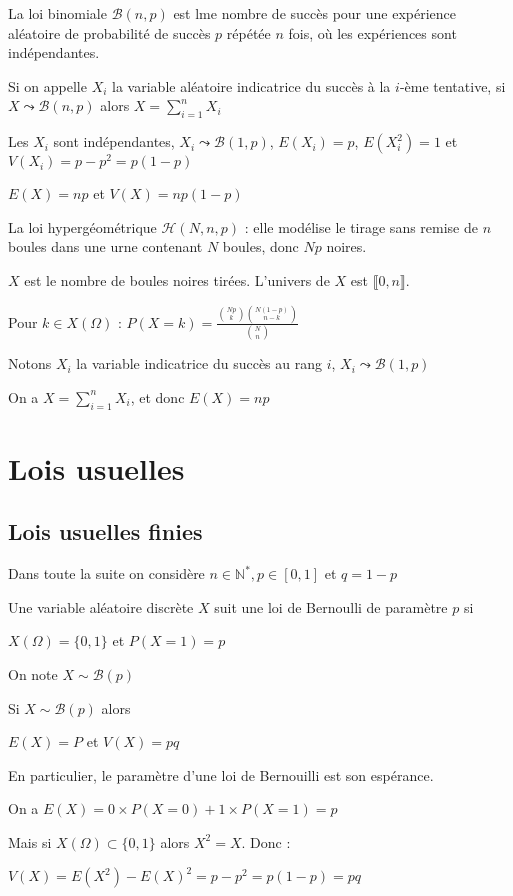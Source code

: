 \documentclass[a4paper,12pt]{book}
\newcommand{\Def}[2]{\begin{tcolorbox}[sharp corners, colback=white,colframe=blue!90!black!75, title=Définition : #1]#2\end{tcolorbox}}
\newcommand{\Prop}[2]{\begin{tcolorbox}[sharp corners, colback=white,colframe=red!90!black!75, title=Proposition : #1]#2\end{tcolorbox}}
\newcommand{\Pre}[1]{\begin{tcolorbox}[sharp corners, colback=white,colframe=green!60!green!30!black!75, title=Preuve]#1\end{tcolorbox}}
\def\N{\mathbb{N}}
\begin{document}
La loi binomiale $\mathcal{B}(n,p)$ est lme nombre de succès pour une expérience aléatoire de probabilité de succès $p$ répétée $n$ fois, où les expériences sont indépendantes.
\par Si on appelle $X_i$ la variable aléatoire indicatrice du succès à la $i$-ème tentative, si $X\leadsto \mathcal{B}(n,p)$ alors $X=\sum\limits_{i=1}^n X_i$
\par Les $X_i$ sont indépendantes, $X_i\leadsto \mathcal{B}(1,p)$, $E(X_i) = p$, $E(X_i^2)=1$ et $V(X_i) = p - p^2 = p(1-p)$
\par $E(X) = np$ et $V(X)=np(1-p)$
\par La loi hypergéométrique $\mathcal{H}(N, n, p)$ : elle modélise le tirage sans remise de $n$ boules dans une urne contenant $N$ boules, donc $Np$ noires.
\par $X$ est le nombre de boules noires tirées. L'univers de $X$ est $\llbracket 0, n\rrbracket$.
\par Pour $k\in X(\Omega)$ : $P(X=k) = \frac{\binom{Np}{k}\binom{N(1-p)}{n-k}}{\binom{N}{n}}$
\par Notons $X_i$ la variable indicatrice du succès au rang $i$, $X_i\leadsto \mathcal{B}(1,p)$
\par On a $X=\sum\limits_{i=1}^n X_i$, et donc $E(X) = np$

\section{Lois usuelles}
\subsection{Lois usuelles finies}
Dans toute la suite on considère $n\in\N^*, p\in[0,1]$ et $q=1-p$
\Def{}{Une variable aléatoire discrète $X$ suit une loi de Bernoulli de paramètre $p$ si
\par\begin{center}$X(\Omega)=\{0,1\}$ et $P(X=1)=p$\end{center}
\par On note $X\sim\mathcal{B}(p)$}
\Prop{}{Si $X\sim\mathcal{B}(p)$ alors
\par\begin{center}$E(X)=P$ et $V(X)=pq$\end{center}
En particulier, le paramètre d'une loi de Bernouilli est son espérance.}
\Pre{On a $E(X) = 0 \times P(X=0) + 1\times P(X=1) = p$
\par Mais si $X(\Omega)\subset\{0,1\}$ alors $X^2=X$. Donc :
\par $V(X)=E(X^2)-E(X)^2= p - p^2 = p(1-p)=pq$}
\end{document}
